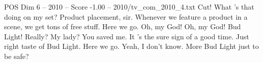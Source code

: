 \begin{textsample}{POS Dim 6 – 2010 – Score -1.00 – 2010/tv\_com\_2010\_4.txt}  \label{ex:f6_pos_069}
Cut!
What 's that doing on my set?
Product placement, sir.
Whenever we feature a product in a scene, we get tons of free stuff.
Here we go.
Oh, my God!
Oh, my God!
Bud Light!
Really?
My lady?
You saved me.
It 's the sure sign of a good time.
Just right taste of Bud Light.
Here we go.
Yeah, I don't know.
More Bud Light just to be safe?

\end{textsample}
